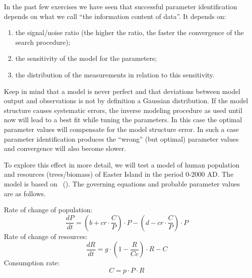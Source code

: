 In the past few exercises we have seen that successful parameter identification
depends on what we call ``the information content of data''. It depends on:
\begin{enumerate}
\item{the signal/noise ratio (the higher the ratio, the faster the convergence
of the search procedure);}
\item{the sensitivity of the model for the parameters;}
\item{the distribution of the measurements in relation to this sensitivity.}
\end{enumerate}

Keep in mind that a model is never perfect and that deviations between model
output and observations is not by definition a Gaussian distribution. If the
model structure causes systematic errors, the inverse modeling procedure as used
until now will lead to a best fit while tuning the parameters. In this case the
optimal parameter values will compensate for the model structure error. In such
a case parameter identification produces the ``wrong'' (but optimal) parameter
values and convergence will also become slower.

To explore this effect in more detail, we will test a model of human population
and resources (trees/biomass) of Easter Island in the period 0-2000 AD. The
model is based on \citeauthor*{bran-tayl1998}~(\citeyear{bran-tayl1998}). The
governing equations and probable parameter values are as follows.


Rate of change of population:
\begin{equation}
\label{eq:easter-island-popgrowth}
\frac{dP}{dt} = (b+cr\cdot{}\frac{C}{P})\cdot{}P-(d-cr\cdot{}\frac{C}{P})\cdot{P}
\end{equation}
Rate of change of resources:
\begin{equation}
\frac{dR}{dt} = g\cdot{}(1-\frac{R}{Cc})\cdot{}R-C
\end{equation}
Consumption rate:
\begin{equation}
C = p\cdot{}P\cdot{}R
\end{equation}

